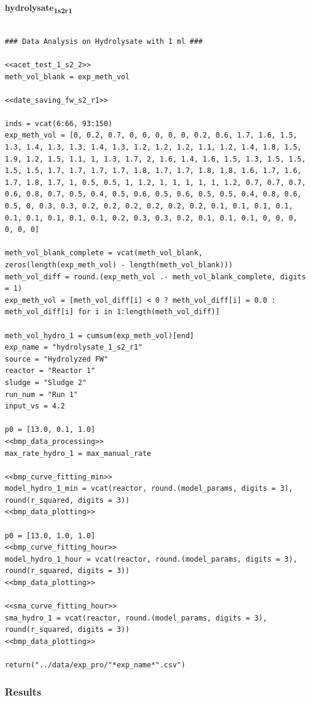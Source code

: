 \documentclass[11pt]{article}
\begin{document}
\textbf{hydrolysate\textsubscript{1}\textsubscript{s2}\textsubscript{r1}}
\begin{verbatim}

### Data Analysis on Hydrolysate with 1 ml ###

<<acet_test_1_s2_2>>
meth_vol_blank = exp_meth_vol

<<date_saving_fw_s2_r1>>

inds = vcat(6:66, 93:150)
exp_meth_vol = [0, 0.2, 0.7, 0, 0, 0, 0, 0, 0.2, 0.6, 1.7, 1.6, 1.5, 1.3, 1.4, 1.3, 1.3, 1.4, 1.3, 1.2, 1.2, 1.2, 1.1, 1.2, 1.4, 1.8, 1.5, 1.9, 1.2, 1.5, 1.1, 1, 1.3, 1.7, 2, 1.6, 1.4, 1.6, 1.5, 1.3, 1.5, 1.5, 1.5, 1.5, 1.7, 1.7, 1.7, 1.7, 1.8, 1.7, 1.7, 1.8, 1.8, 1.6, 1.7, 1.6, 1.7, 1.8, 1.7, 1, 0.5, 0.5, 1, 1.2, 1, 1, 1, 1, 1, 1.2, 0.7, 0.7, 0.7, 0.6, 0.8, 0.7, 0.5, 0.4, 0.5, 0.6, 0.5, 0.6, 0.5, 0.5, 0.4, 0.8, 0.6, 0.5, 0, 0.3, 0.3, 0.2, 0.2, 0.2, 0.2, 0.2, 0.2, 0.1, 0.1, 0.1, 0.1, 0.1, 0.1, 0.1, 0.1, 0.1, 0.2, 0.3, 0.3, 0.2, 0.1, 0.1, 0.1, 0, 0, 0, 0, 0, 0]

meth_vol_blank_complete = vcat(meth_vol_blank, zeros(length(exp_meth_vol) - length(meth_vol_blank)))
meth_vol_diff = round.(exp_meth_vol .- meth_vol_blank_complete, digits = 1)
exp_meth_vol = [meth_vol_diff[i] < 0 ? meth_vol_diff[i] = 0.0 : meth_vol_diff[i] for i in 1:length(meth_vol_diff)]

meth_vol_hydro_1 = cumsum(exp_meth_vol)[end]
exp_name = "hydrolysate_1_s2_r1"
source = "Hydrolyzed FW"
reactor = "Reactor 1"
sludge = "Sludge 2"
run_num = "Run 1"
input_vs = 4.2

p0 = [13.0, 0.1, 1.0]
<<bmp_data_processing>>
max_rate_hydro_1 = max_manual_rate

<<bmp_curve_fitting_min>>
model_hydro_1_min = vcat(reactor, round.(model_params, digits = 3), round(r_squared, digits = 3))
<<bmp_data_plotting>>

p0 = [13.0, 1.0, 1.0]
<<bmp_curve_fitting_hour>>
model_hydro_1_hour = vcat(reactor, round.(model_params, digits = 3), round(r_squared, digits = 3))
<<bmp_data_plotting>>

<<sma_curve_fitting_hour>>
sma_hydro_1 = vcat(reactor, round.(model_params, digits = 3), round(r_squared, digits = 3))
<<bmp_data_plotting>>

return("../data/exp_pro/"*exp_name*".csv")
\end{verbatim}

\subsubsection{Results}
\label{sec:orgf0fa675}
\end{document}
